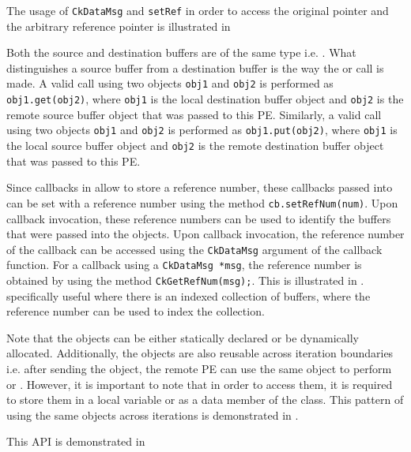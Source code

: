 The usage of \texttt{CkDataMsg} and \texttt{setRef} in order to access the original
pointer and the arbitrary reference pointer is illustrated in

Both the source and destination buffers are of the same type i.e. .
What distinguishes a source buffer from a destination buffer is the way the  or
 call is made. A valid  call using two  objects \texttt{obj1} and
\texttt{obj2} is performed as \texttt{obj1.get(obj2)}, where \texttt{obj1} is the local destination
buffer object and \texttt{obj2} is the remote source buffer object that was passed to this PE.
Similarly, a valid  call using two  objects \texttt{obj1} and
\texttt{obj2} is performed as \texttt{obj1.put(obj2)}, where \texttt{obj1} is the local source buffer
object and \texttt{obj2} is the remote destination buffer object that was passed to this PE.

Since callbacks in \charmpp{} allow to store a reference number, these
callbacks passed into  can be set with a
reference number using the method \texttt{cb.setRefNum(num)}. Upon callback
invocation, these reference numbers can be used to identify the buffers that
were passed into the  objects. Upon callback invocation, the
reference number of the callback can be accessed using the \texttt{CkDataMsg}
argument of the callback function. For a callback using a \texttt{CkDataMsg *msg},
the reference number is obtained by using the method \texttt{CkGetRefNum(msg);}.
This is illustrated in .
specifically useful where there is an indexed collection of buffers, where the
reference number can be used to index the collection.

Note that the  objects can be
either statically declared or be dynamically allocated.
Additionally, the objects are also reusable across iteration boundaries i.e.
after sending the  object, the remote PE can use
the same object to perform  or . However, it is
important to note that in order to access them, it is required
to store them in a local variable or as a data member of the class. This pattern
of using the same objects across iterations is demonstrated in
.

This API is demonstrated in 


